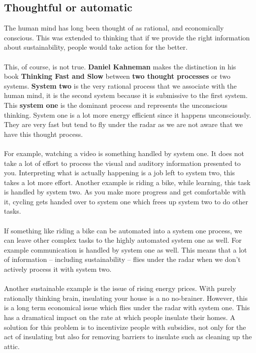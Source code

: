 \documentclass[../summary.tex]{subfiles}
\begin{document}
		\newpage	
		\subsection{Thoughtful or automatic}
			The human mind has long been thought of as rational, and economically conscious. This was extended to thinking that if we provide the right information about sustainability, people would take action for the better. \\
			\\
			This, of course, is not true. \textbf{Daniel Kahneman} makes the distinction in his book \textbf{Thinking Fast and Slow} between \textbf{two thought processes} or two systems. \textbf{System two} is the very rational process that we associate with the human mind, it is the second system because it is submissive to the first system. This \textbf{system one} is the dominant process and represents the unconscious thinking. System one is a lot more energy efficient since it happens unconsciously. They are very fast but tend to fly under the radar as we are not aware that we have this thought process. \\
			\\
			For example, watching a video is something handled  by system one. It does not take a lot of effort to process the visual and auditory information presented to you. Interpreting what is actually happening is a job left to system two, this takes a lot more effort. Another example is riding a bike, while learning, this task is handled by system two. As you make more progress and get comfortable with it, cycling gets handed over to system one which frees up system two to do other tasks. \\
			\\
			If something like riding a bike can be automated into a system one process, we can leave other complex tasks to the highly automated system one as well. For example communication is handled by system one as well. This means that a lot of information -- including sustainability -- flies under the radar when we don't actively process it with system two. \\
			\\
			Another sustainable example is the issue of rising energy prices. With purely rationally thinking brain, insulating your house is a no no-brainer.  However, this is a long term economical issue which flies under the radar with system one. This has a dramatical impact on the rate at which people insulate their homes. A solution for this problem is to incentivize people with subsidies, not only for the act of insulating but also for removing barriers to  insulate such as cleaning up the attic. 
			
\end{document}
